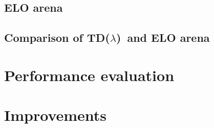 \documentclass[11pt]{article}
\newcommand{\tdl}{TD($\lambda$)}
\begin{document}
\subsection{ELO arena}

\subsection{Comparison of \tdl\ and ELO arena}

\section{Performance evaluation}

\section{Improvements}




\end{document}
